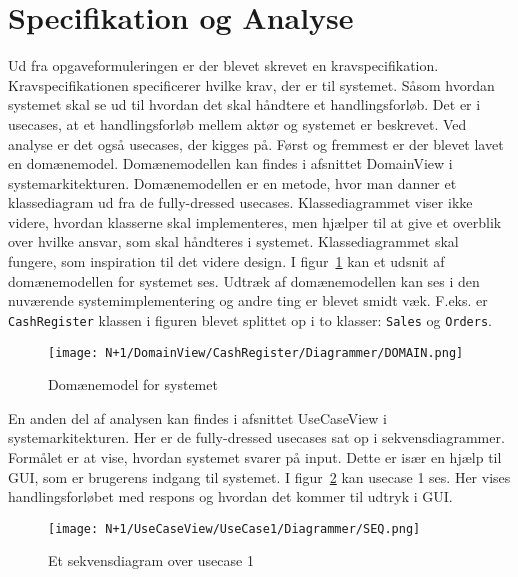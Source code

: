 \section{Specifikation og Analyse}
\label{sec:specandanal}
Ud fra opgaveformuleringen er der blevet skrevet en kravspecifikation. Kravspecifikationen specificerer hvilke krav, der er til \gls{system}et. Såsom hvordan \gls{system}et skal se ud til hvordan det skal håndtere et handlingsforløb. Det er i \gls{usecase}s, at et handlingsforløb mellem aktør og \gls{system}et er beskrevet. Ved analyse er det også \gls{usecase}s, der kigges på.
\newline\newline
Først og fremmest er der blevet lavet en domænemodel. Domænemodellen kan findes i afsnittet DomainView i systemarkitekturen. Domænemodellen er en metode, hvor man danner et klassediagram ud fra de fully-dressed \gls{usecase}s. Klassediagrammet viser ikke videre, hvordan klasserne skal implementeres, men hjælper til at give et overblik over hvilke ansvar, som skal håndteres i \gls{system}et. Klassediagrammet skal fungere, som inspiration til det videre design. 
\newline\newline
I figur~\ref{fig:domainmodel} kan et udsnit af domænemodellen for \gls{system}et ses. Udtræk af domænemodellen kan ses i den nuværende systemimplementering og andre ting er blevet smidt væk. F.eks. er \texttt{CashRegister} klassen i figuren blevet splittet op i to klasser: \texttt{Sales} og \texttt{Orders}.

\begin{figure}[H]
	\centering
	\texttt{[image: N+1/DomainView/CashRegister/Diagrammer/DOMAIN.png]}
	\caption{Domænemodel for \Gls{system}et}
	\label{fig:domainmodel}
\end{figure}

En anden del af analysen kan findes i afsnittet UseCaseView i systemarkitekturen. Her er de fully-dressed \gls{usecase}s sat op i sekvensdiagrammer. Formålet er at vise, hvordan \gls{system}et svarer på input. Dette er især en hjælp til \gls{GUI}, som er brugerens indgang til systemet. I figur~\ref{fig:usecaseviewseq} kan \gls{usecase} 1 ses. Her vises handlingsforløbet med respons og hvordan det kommer til udtryk i \gls{GUI}.

\begin{figure}[H]
	\centering
	\texttt{[image: N+1/UseCaseView/UseCase1/Diagrammer/SEQ.png]}
	\caption{Et sekvensdiagram over \gls{usecase} 1}
	\label{fig:usecaseviewseq}
\end{figure}